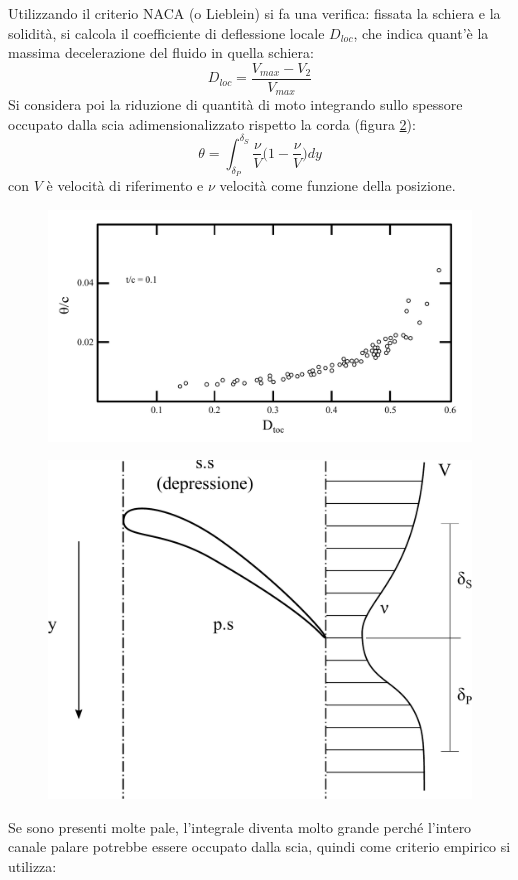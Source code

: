 Utilizzando il criterio NACA (o Lieblein) si fa una verifica: fissata la schiera e la solidità, si calcola il coefficiente di deflessione locale $D_{loc}$, che indica quant'è la massima decelerazione del fluido in quella schiera:
\begin{equation}\label{eq:D_loc}
D_{loc} = \frac{V_{max} - V_2}{V_{max}}
\end{equation}
Si considera poi la riduzione di quantità di moto integrando sullo spessore occupato dalla scia adimensionalizzato rispetto la corda (figura \ref{fig:CritCarico2}):
\begin{equation}\label{eq:D_ridqmot}
\theta = \int_{\delta_P}^{\delta_S} \frac{\nu}{V} \bigg(1- \frac{\nu}{V} \bigg) dy
\end{equation} 
con $V$ è velocità di riferimento e $\nu$ velocità come funzione della posizione.
\begin{figure}[h!]
\centering
  \includegraphics[width=\textwidth]{fig/CritCarico1.pdf}
\caption{}
\label{fig:CritCarico1}
\end{figure}
\begin{figure}[h!]
\centering
  \includegraphics[width=.4\textwidth]{fig/CritCarico2.pdf}
\caption{}
\label{fig:CritCarico2}
\end{figure}
Se sono presenti molte pale, l'integrale diventa molto grande perché l'intero canale palare potrebbe essere occupato dalla scia, quindi come criterio empirico si utilizza:
